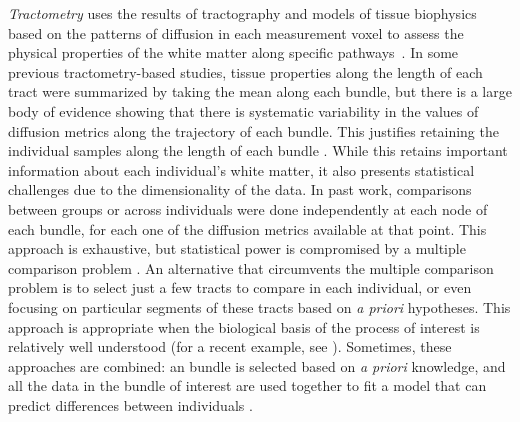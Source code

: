 \emph{Tractometry} uses the results of tractography and models
of tissue biophysics based on the patterns of diffusion in each measurement
voxel to assess the physical properties of the white matter along specific
pathways~\cite{Bells2011-cf}.
In some previous tractometry-based studies, tissue properties along the
length of each tract were summarized by taking the mean along each
bundle, but there is a large body of evidence showing that there is
systematic variability in the values of diffusion metrics along the
trajectory of each bundle. This justifies retaining the individual
samples along the length of each bundle \cite{yeatman2012tract,
colby2012, ODonnell2009-uu}. While this retains important information
about each individual's white matter, it also presents statistical
challenges due to the dimensionality of the data. In past work,
comparisons between groups or across individuals were done
independently at each node of each bundle, for each one of the
diffusion metrics available at that point. This approach is exhaustive, but
statistical power is compromised by a multiple comparison problem
\cite{colby2012, Nichols2002-zu, Nichols2003-yy}. An alternative that
circumvents the multiple comparison problem is to select just a few
tracts to compare in each individual, or even focusing on particular
segments of these tracts based on \emph{a priori} hypotheses. This
approach is appropriate when the biological basis of the process
of interest is relatively well understood (for a recent example, see
\cite{huber2018rapid}). Sometimes, these approaches are combined: an
bundle is selected based on \emph{a priori} knowledge, and all the data
in the bundle of interest are used together to fit a model that can
predict differences between individuals \cite{dayan2016profilometry}.

